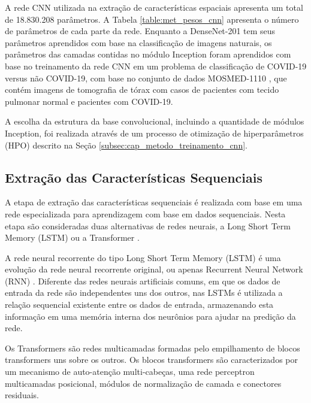 A rede CNN utilizada na extração de características espaciais apresenta um total de 18.830.208 parâmetros. A Tabela \ref{table:met_pesos_cnn} apresenta o número de parâmetros de cada parte da rede. Enquanto a DenseNet-201 tem seus parâmetros aprendidos com base na classificação de imagens naturais, os parâmetros das camadas contidas no módulo Inception foram aprendidos com base no treinamento da rede CNN em um problema de classificação de COVID-19 versus não COVID-19, com base no conjunto de dados MOSMED-1110 \cite{morozov2020mosmeddata}, que contém imagens de tomografia de tórax com casos de pacientes com tecido pulmonar normal e pacientes com COVID-19.

A escolha da estrutura da base convolucional, incluindo a quantidade de módulos Inception, foi realizada através de um processo de otimização de hiperparâmetros (HPO) descrito na Seção \ref{subsec:cap_metodo_treinamento_cnn}.


\subsection{Extração das Características Sequenciais}\label{subsec:cap_metodo_carac_sequenciais}

A etapa de extração das características sequenciais é realizada com base em uma rede especializada para aprendizagem com base em dados sequenciais. Nesta etapa são consideradas duas alternativas de redes neurais, a Long Short Term Memory (LSTM) \cite{hochreiter1997long, zaremba2014recurrent, graves2005framewise} ou a Transformer \cite{vaswani2017attention}.

A rede neural recorrente do tipo Long Short Term Memory (LSTM) \cite{hochreiter1997long, zaremba2014recurrent, graves2005framewise} é uma evolução da rede neural recorrente original, ou apenas Recurrent Neural Network (RNN) \cite{Rumelhart1986}. Diferente das redes neurais artificiais comuns, em que os dados de entrada da rede são independentes uns dos outros, nas LSTMs é utilizada a relação sequencial existente entre os dados de entrada, armazenando esta informação em uma memória interna dos neurônios para ajudar na predição da rede. 

Os Transformers \cite{vaswani2017attention} são redes multicamadas formadas pelo empilhamento de blocos transformers uns sobre os outros. Os blocos transformers são caracterizados por um mecanismo de auto-atenção multi-cabeças, uma rede perceptron multicamadas posicional, módulos de normalização de camada \cite{ba2016layer} e conectores residuais.


